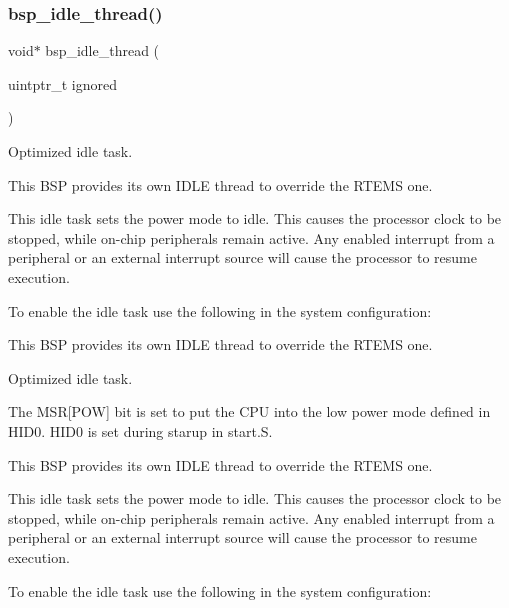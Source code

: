 \subsubsection{\texorpdfstring{bsp\_idle\_thread()}{bsp\_idle\_thread()}}
{\footnotesize\ttfamily void$\ast$ bsp\+\_\+idle\+\_\+thread (\begin{DoxyParamCaption}\item[{uintptr\+\_\+t}]{ignored }\end{DoxyParamCaption})}



Optimized idle task. 

This B\+SP provides its own I\+D\+LE thread to override the R\+T\+E\+MS one.

This idle task sets the power mode to idle. This causes the processor clock to be stopped, while on-\/chip peripherals remain active. Any enabled interrupt from a peripheral or an external interrupt source will cause the processor to resume execution.

To enable the idle task use the following in the system configuration\+:


\begin{DoxyCode}{0}
\DoxyCodeLine{\textcolor{preprocessor}{\#include <bsp.h>}}
\DoxyCodeLine{}
\DoxyCodeLine{\textcolor{preprocessor}{\#define CONFIGURE\_INIT}}
\DoxyCodeLine{}
\DoxyCodeLine{\textcolor{preprocessor}{\#define CONFIGURE\_IDLE\_TASK\_BODY bsp\_idle\_thread}}
\DoxyCodeLine{}
\end{DoxyCode}


This B\+SP provides its own I\+D\+LE thread to override the R\+T\+E\+MS one.

Optimized idle task.

The M\+SR\mbox{[}P\+OW\mbox{]} bit is set to put the C\+PU into the low power mode defined in H\+I\+D0. H\+I\+D0 is set during starup in start.\+S.

This B\+SP provides its own I\+D\+LE thread to override the R\+T\+E\+MS one.

This idle task sets the power mode to idle. This causes the processor clock to be stopped, while on-\/chip peripherals remain active. Any enabled interrupt from a peripheral or an external interrupt source will cause the processor to resume execution.

To enable the idle task use the following in the system configuration\+:


\begin{DoxyCode}{0}
\DoxyCodeLine{\textcolor{preprocessor}{\#include <bsp.h>}}
\DoxyCodeLine{}
\DoxyCodeLine{\textcolor{preprocessor}{\#define CONFIGURE\_INIT}}
\DoxyCodeLine{}
\DoxyCodeLine{\textcolor{preprocessor}{\#define CONFIGURE\_IDLE\_TASK\_BODY bsp\_idle\_thread}}
\DoxyCodeLine{}
\end{DoxyCode}


